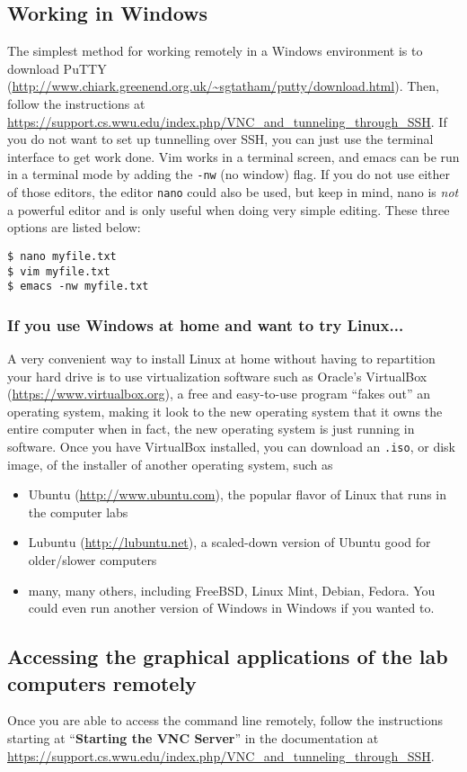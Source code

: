 \documentclass[12pt]{article}
\begin{document}
\subsection{Working in Windows}
The simplest method for working remotely in a Windows environment is to download PuTTY (\url{http://www.chiark.greenend.org.uk/~sgtatham/putty/download.html}). Then, follow the instructions at \url{https://support.cs.wwu.edu/index.php/VNC_and_tunneling_through_SSH}. If you do not want to set up tunnelling over SSH, you can just use the terminal interface to get work done. Vim works in a terminal screen, and emacs can be run in a terminal mode by adding the \verb|-nw| (no window) flag. If you do not use either of those editors, the editor \verb|nano| could also be used, but keep in mind, nano is \emph{not} a powerful editor and is only useful when doing very simple editing. These three options are listed below:
\begin{verbatim}
$ nano myfile.txt
$ vim myfile.txt
$ emacs -nw myfile.txt
\end{verbatim}

\subsubsection{If you use Windows at home and want to try Linux...}
A very convenient way to install Linux at home without having to repartition your hard drive is to use virtualization software such as Oracle's VirtualBox (\url{https://www.virtualbox.org}), a free and easy-to-use program ``fakes out'' an operating system, making it look to the new operating system that it owns the entire computer when in fact, the new operating system is just running in software.  Once you have VirtualBox installed, you can download an \verb|.iso|, or disk image, of the installer of another operating system, such as
\begin{itemize}
	\item Ubuntu (\url{http://www.ubuntu.com}), the popular flavor of Linux that runs in the computer labs
	\item Lubuntu (\url{http://lubuntu.net}), a scaled-down version of Ubuntu good for older/slower computers
	\item many, many others, including FreeBSD, Linux Mint, Debian, Fedora.  You could even run another version of Windows in Windows if you wanted to.
\end{itemize}

\subsection{Accessing the graphical applications of the lab computers remotely}
Once you are able to access the command line remotely, follow the instructions starting at ``\textbf{Starting the VNC Server}'' in the documentation at \url{https://support.cs.wwu.edu/index.php/VNC_and_tunneling_through_SSH}.
\end{document}
